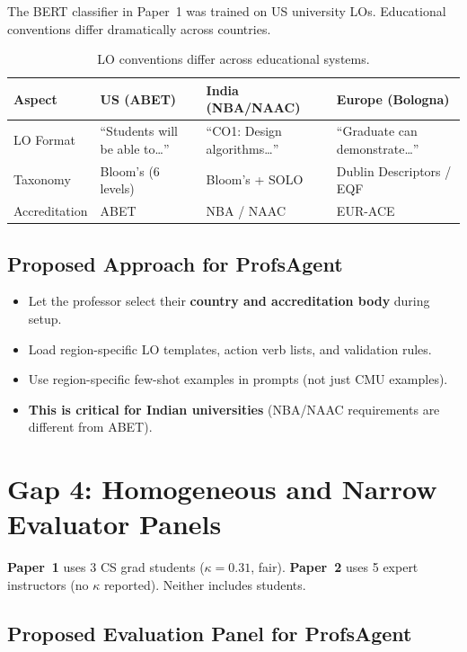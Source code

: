 \documentclass[11pt,a4paper]{article}
\begin{document}
The BERT classifier in Paper~1 was trained on US university LOs. Educational conventions differ dramatically across countries.

\begin{table}[H]
\centering
\caption{LO conventions differ across educational systems.}
\begin{tabular}{@{}lp{3cm}p{3cm}p{3.5cm}@{}}
\toprule
\textbf{Aspect} & \textbf{US (ABET)} & \textbf{India (NBA/NAAC)} & \textbf{Europe (Bologna)} \\
\midrule
LO Format & ``Students will be able to\ldots'' & ``CO1: Design algorithms\ldots'' & ``Graduate can demonstrate\ldots'' \\
Taxonomy & Bloom's (6 levels) & Bloom's + SOLO & Dublin Descriptors / EQF \\
Accreditation & ABET & NBA / NAAC & EUR-ACE \\
\bottomrule
\end{tabular}
\end{table}

\subsection{Proposed Approach for ProfsAgent}
\begin{itemize}[nosep]
    \item Let the professor select their \textbf{country and accreditation body} during setup.
    \item Load region-specific LO templates, action verb lists, and validation rules.
    \item Use region-specific few-shot examples in prompts (not just CMU examples).
    \item \textbf{This is critical for Indian universities} (NBA/NAAC requirements are different from ABET).
\end{itemize}

\section{Gap 4: Homogeneous and Narrow Evaluator Panels}

\textbf{Paper~1} uses 3 CS grad students ($\kappa = 0.31$, fair). \textbf{Paper~2} uses 5 expert instructors (no $\kappa$ reported). Neither includes students.

\subsection{Proposed Evaluation Panel for ProfsAgent}
\end{document}
